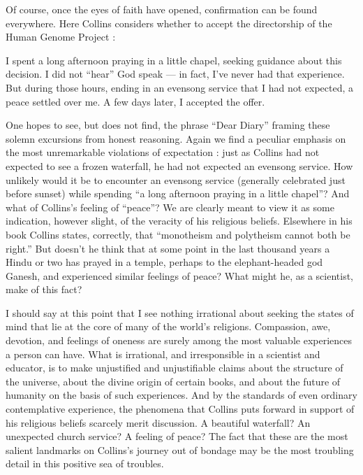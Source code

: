 \documentclass[a4paper,14pt]{extarticle}
\begin{document}
Of course, once the eyes of faith have opened, confirmation can be found everywhere.
Here Collins considers whether to accept the directorship of the Human Genome Project :

I spent a long afternoon praying in a little chapel, seeking guidance about this decision.
I did not ``hear'' God speak --- in fact, I’ve never had that experience.
But during those hours, ending in an evensong service that I had not expected, a peace settled over me.
A few days later, I accepted the offer.

One hopes to see, but does not find, the phrase ``Dear Diary'' framing these solemn excursions from honest reasoning.
Again we find a peculiar emphasis on the most unremarkable violations of expectation :
just as Collins had not expected to see a frozen waterfall, he had not expected an evensong service.
How unlikely would it be to encounter an evensong service (generally celebrated just before sunset) while spending ``a long afternoon praying in a little chapel''?
And what of Collins’s feeling of ``peace''?
We are clearly meant to view it as some indication, however slight, of the veracity of his religious beliefs.
Elsewhere in his book Collins states, correctly, that ``monotheism and polytheism cannot both be right.''
But doesn’t he think that at some point in the last thousand years a Hindu or two has prayed in a temple, perhaps to the elephant-headed god Ganesh, and experienced similar feelings of peace?
What might he, as a scientist, make of this fact?

I should say at this point that I see nothing irrational about seeking the states of mind that lie at the core of many of the world’s religions.
Compassion, awe, devotion, and feelings of oneness are surely among the most valuable experiences a person can have.
What is irrational, and irresponsible in a scientist and educator, is to make unjustified and unjustifiable claims about the structure of the universe, about the divine origin of certain books, and about the future of humanity on the basis of such experiences.
And by the standards of even ordinary contemplative experience, the phenomena that Collins puts forward in support of his religious beliefs scarcely merit discussion.
A beautiful waterfall?
An unexpected church service?
A feeling of peace?
The fact that these are the most salient landmarks on Collins’s journey out of bondage may be the most troubling detail in this positive sea of troubles.
\end{document}
